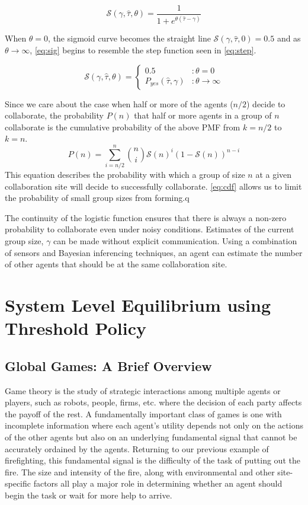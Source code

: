 \documentclass[conference]{ieeeconf}
\def\estt{\hat{\tau}}
\def\estg{\gamma}
\newcommand{\sig}{\mathcal{S}}
\begin{document}
\begin{equation}\label{eq:sig}
	\sig(\estg, \estt, \theta) = \frac{1}{1 + e^{\theta(\estt - \estg)}}
\end{equation}

When $\theta = 0$, the sigmoid curve becomes the straight line $\sig(\estg, \estt, 0) = 0.5$ and as $\theta \to \infty$, \eqref{eq:sig} begins to resemble the step function seen in \eqref{eq:step}.

\begin{equation}
	\sig(\estg, \estt, \theta) =  \left\{
	\begin{array}{ll}
		0.5 & : \theta = 0\\ 
		P_{yes}(\estt,\estg) & : \theta \to \infty
	\end{array}\right.
\end{equation}

Since we care about the case when half or more of the agents ($n/2$) decide to collaborate, the probability $P(n)$ that half or more agents in a group of $n$ collaborate is the cumulative probability of the above PMF from $k = {n/2}$ to $k = n$. 
\begin{equation}
	P(n) = \sum\limits_{i={n/2}}^{n}\binom{n}{i}\sig(n)^{i}\left(1 - \sig(n)\right)^{n - i}\label{eq:cdf}
\end{equation}
This equation describes the probability with which a group of size $n$ at a given collaboration site will decide to successfully collaborate. \eqref{eq:cdf} allows us to limit the probability of small group sizes from forming.q 

The continuity of the logistic function ensures that there is always a non-zero probability to collaborate even under noisy conditions. Estimates of the current group size, $\estg$ can be made without explicit communication. Using a combination of sensors and Bayesian inferencing techniques, an agent can estimate the number of other agents that should be at the same collaboration site.

\section{System Level Equilibrium using Threshold Policy}\label{sec:ggames}
\subsection{Global Games: A Brief Overview}\label{sec:ggoverview}
Game theory is the study of strategic interactions among multiple agents or players, such as robots, people, firms, etc. where the decision of each party affects the payoff of the rest. A fundamentally important class of games is one with incomplete information where each agent's utility depends not only on the actions of the other agents but also on an underlying fundamental signal that cannot be accurately ordained by the agents. Returning to our previous example of firefighting, this fundamental signal is the difficulty of the task of putting out the fire. The size and intensity of the fire, along with environmental and other site-specific factors all play a major role in determining whether an agent should begin the task or wait for more help to arrive. 
\end{document}
